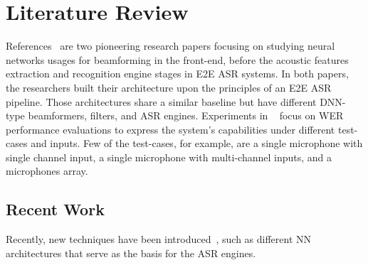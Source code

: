 \section{Literature Review}
References~\cite{7472778, 7952160} are 
two pioneering research papers focusing on 
studying neural networks usages
for beamforming in the front-end,
before the acoustic features extraction and
recognition engine stages in E2E ASR systems.
In both papers, the researchers built their architecture
upon the principles of an E2E ASR pipeline.
Those architectures share a similar baseline but have different
DNN-type beamformers, filters, and ASR engines.
Experiments in ~\cite{7472778, 7952160}
focus on WER performance evaluations to express
the system's capabilities under 
different test-cases and inputs.
Few of the test-cases, for example, are a single microphone 
with single channel input,
a single microphone with multi-channel inputs,
and a microphones array.




\subsection{Recent Work}
Recently, new techniques have been introduced~\cite{900384911,20202222222,9003849,7471664,8466865},
such as
different NN architectures that serve as the basis for
the ASR engines.  

